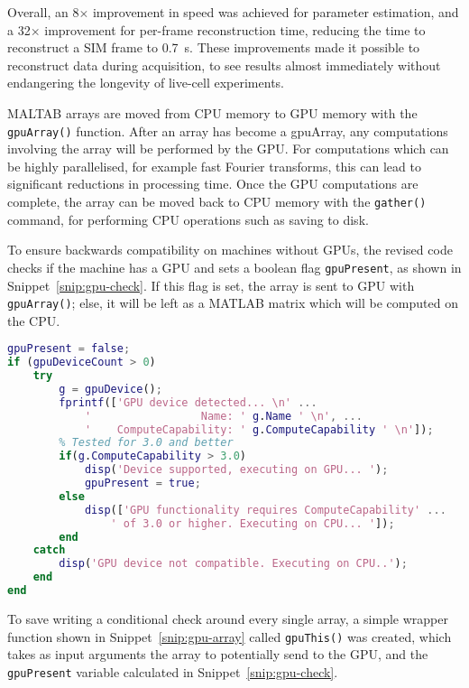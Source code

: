 Overall, an 8$\times$ improvement in speed was achieved for parameter estimation, and a 32$\times$ improvement for per-frame reconstruction time, reducing the time to reconstruct a SIM frame to \SI{0.7}{\second}. 
These improvements made it possible to reconstruct data during acquisition, to see results almost immediately without endangering the longevity of live-cell experiments. 

MALTAB arrays are moved from CPU memory to GPU memory with the \texttt{gpuArray()} function. 
After an array has become a gpuArray, any computations involving the array will be performed by the GPU. 
For computations which can be highly parallelised, for example fast Fourier transforms, this can lead to significant reductions in processing time. 
Once the GPU computations are complete, the array can be moved back to CPU memory with the \texttt{gather()} command, for performing CPU operations such as saving to disk. 

To ensure backwards compatibility on machines without GPUs, the revised code checks if the machine has a GPU and sets a boolean flag \texttt{gpuPresent}, as shown in Snippet~\ref{snip:gpu-check}. 
If this flag is set, the array is sent to GPU with \texttt{gpuArray()}; else, it will be left as a MATLAB matrix which will be computed on the CPU. 

\begin{lstfloat}
\begin{lstlisting}[language=matlab,caption={A check must be performed at the start of the top-level MATLAB program to detect if a suitable graphics card is installed for GPU computation},label={snip:gpu-check},frame=single]
gpuPresent = false; 
if (gpuDeviceCount > 0) 
    try
        g = gpuDevice();
        fprintf(['GPU device detected... \n' ...
            '                 Name: ' g.Name ' \n', ...
            '    ComputeCapability: ' g.ComputeCapability ' \n']);
        % Tested for 3.0 and better
        if(g.ComputeCapability > 3.0)
            disp('Device supported, executing on GPU... '); 
            gpuPresent = true; 
        else
            disp(['GPU functionality requires ComputeCapability' ...
                ' of 3.0 or higher. Executing on CPU... ']); 
        end
    catch
        disp('GPU device not compatible. Executing on CPU..');
    end
end
\end{lstlisting}
\end{lstfloat}


To save writing a conditional check around every single array, a simple wrapper function shown in Snippet~\ref{snip:gpu-array} called \texttt{gpuThis()} was created, which takes as input arguments the array to potentially send to the GPU, and the \texttt{gpuPresent} variable calculated in Snippet~\ref{snip:gpu-check}.

